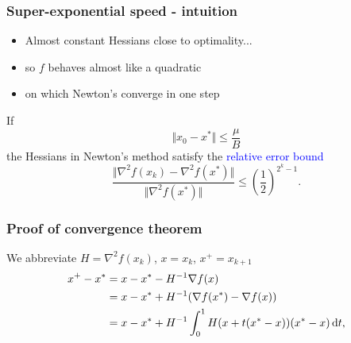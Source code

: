\documentclass[aspectratio=149]{beamer}
\begin{document}
\begin{frame}
  \frametitle{Super-exponential speed - intuition}

  \begin{itemize}
    \item Almost constant Hessians close to optimality...
    \item so $f$ behaves almost like a quadratic
    \item on which Newton's converge in one step
  \end{itemize}

  \begin{lemma}%
    If
    \begin{equation}
      \Vert x_0 - x^* \Vert \le \frac{\mu}{B}
    \end{equation}
    the Hessians in Newton's method satisfy the \textcolor{blue}{relative error bound}
    \begin{equation}
      \frac{\Vert  \nabla^2 f(x_k) - \nabla^2 f(x^*) \Vert}{\Vert \nabla^2 f(x^*) \Vert} \le {\left( \frac12 \right)}^{2^k-1}.
    \end{equation}
  \end{lemma}
\end{frame}


\begin{frame}
  \frametitle{Proof of convergence theorem}
  We abbreviate $H = \nabla^2 f(x_k)$, $x=x_k$, $x^+ = x_{k+1}$
  \begin{equation}
    \begin{aligned}
      x^+ - x^* &= x - x^* - H^{-1} \nabla f(x) \\
      &= x - x^* + H^{-1}( \nabla f(x^*) - \nabla f(x)) \\
      &= x - x^* + H^{-1} \int_{0}^{1} H(x + t(x^* - x))(x^* - x) \mathop{}\!\mathrm{d} t,
    \end{aligned}
  \end{equation}
\end{frame}
\end{document}
